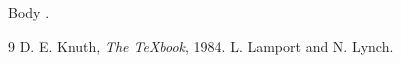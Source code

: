 \documentclass{article}
\begin{document}
Body \cite{knuth} \cite{ll}.
\begin{thebibliography}{9}
 D. E. Knuth, \emph{The \TeX book}, 1984.
 L. Lamport and N. Lynch.
\end{thebibliography}
\clearpage
\citet{knuth}
\citep{knuth}
\citep{knuth,ll}
\citet{knuth,ll}
\citep[p.~2]{knuth}
\citep[see][p.~2]{ll}
\citeauthor{ll}
\citeyear{knuth}
\end{document}
